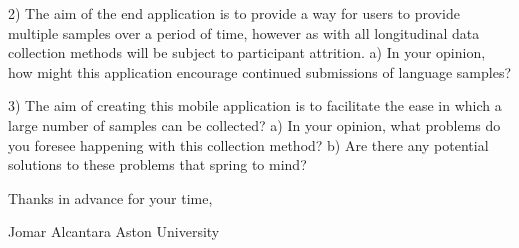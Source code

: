 \documentclass{article}
\begin{document}
2) The aim of the end application is to provide a way for users to provide multiple samples over a period of time, however as with all longitudinal data collection methods will be subject to participant attrition.
	a) In your opinion, how might this application encourage continued submissions of language samples?
	
3) The aim of creating this mobile application is to facilitate the ease in which a large number of samples can be collected? 
	a) In your opinion, what problems do you foresee happening with this collection method? 
	b) Are there any potential solutions to these problems that spring to mind?

Thanks in advance for your time,

Jomar Alcantara
Aston University
\end{document}
